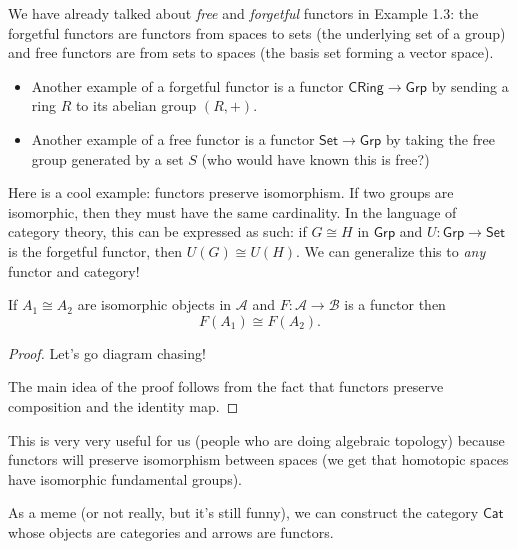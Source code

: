 \begin{example}
    We have already talked about \emph{free} and \emph{forgetful} functors in Example 1.3: the forgetful functors are functors from spaces to sets (the underlying set of a group) and free functors are from sets to spaces (the basis set forming a vector space).
    \begin{itemize}
        \item Another example of a forgetful functor is a functor $\mathsf{CRing}\to \mathsf{Grp}$ by sending a ring $R$ to its abelian group $(R,+)$.
        \item Another example of a free functor is a functor $\mathsf{Set}\to \mathsf{Grp}$ by taking the free group generated by a set $S$ (who would have known this is free?)
    \end{itemize}
\end{example}
Here is a cool example: functors preserve isomorphism. If two groups are isomorphic, then they must have the same cardinality. In the language of category theory, this can be expressed as such: if $G\cong H$ in $\mathsf{Grp}$ and $U \colon \mathsf{Grp} \to \mathsf{Set}$ is the forgetful functor, then $U(G)\cong U(H)$. We can generalize this to \emph{any} functor and category!
\begin{theorem}
    If $A_1\cong A_2$ are isomorphic objects in $\mathcal{A}$ and $F \colon \mathcal{A} \to \mathcal{B}$ is a functor then \[
        F(A_1)\cong F(A_2).
    \] 
\end{theorem}
\begin{proof}
Let's go diagram chasing!
            \begin{figure}[H]
                \centering
            \end{figure}
The main idea of the proof follows from the fact that functors preserve composition and the identity map. 
\end{proof}
This is very very useful for us (people who are doing algebraic topology) because functors will preserve isomorphism between spaces (we get that homotopic spaces have isomorphic fundamental groups).
\begin{note}
    As a meme (or not really, but it's still funny), we can construct the category $\mathsf{Cat}$ whose objects are categories and arrows are functors.
\end{note}

